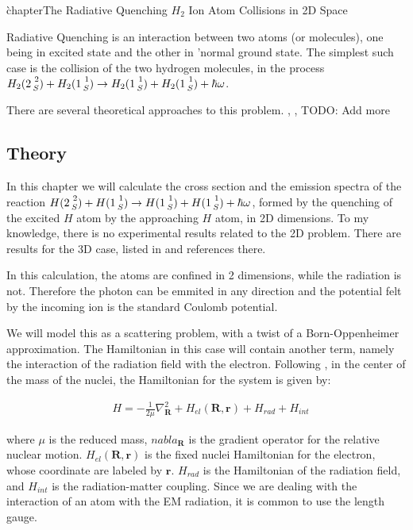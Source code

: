 \`chapter{The Radiative Quenching $ H_2 $  Ion Atom Collisions in 2D Space} 

Radiative Quenching is an interaction between two atoms (or molecules), one being in excited state and the other in 'normal ground state. The simplest such case is the collision of the two hydrogen molecules, in the process $ H_2(2\prescript{2}{S}) + H_2(1\prescript{1}{S}) \rightarrow H_2(1\prescript{1}S) + H_2(1\prescript{1}S) + \hbar\omega $.

There are several theoretical approaches to this problem. \cite{RadQuench1}, \cite{RadQuench2}, \cite{Zygelman88}
TODO: Add more

\subsection{Theory} 

In this chapter we will calculate the cross section and the emission spectra of the reaction $ H(2\prescript{2}{S}) + H(1\prescript{1}{S})\rightarrow H(1\prescript{1}S) + H(1\prescript{1}S) + \hbar\omega $, formed by the quenching of the excited $ H $ atom by the approaching $ H $ atom, in 2D dimensions. To my knowledge, there is no experimental results related to the 2D problem. There are results for the 3D case, listed in \cite{Zygelman88} and references there.

In this calculation, the atoms are confined in 2 dimensions, while the radiation is not. Therefore the photon can be emmited in any direction and the potential felt by the incoming ion is the standard Coulomb potential.

We will model this as a scattering problem, with a twist of a Born-Oppenheimer approximation. The Hamiltonian in this case will contain another term, namely the interaction of the radiation field with the electron.  Following \cite{Zygelman88},  in the center of the mass of the nuclei, the Hamiltonian for the system is given by: 

\begin{equation}\label{eqH} 
\begin{split} 
& H = -\frac{1}{2\mu}\nabla^2_{\mathbf{R}} + H_{el}(\mathbf{R},\mathbf{r}) + H_{rad} + H_{int} 
\end{split} 
\end{equation} 

where $ \mu $ is the reduced mass, $ nabla_{\mathbf{R}} $ is the gradient operator for the relative nuclear motion. $ H_{el}(\mathbf{R},\mathbf{r}) $ is the fixed nuclei Hamiltonian for the electron, whose coordinate are labeled by $ \mathbf{r} $. $ H_{rad} $ is the Hamiltonian of the radiation field, and $ H_{int} $ is the radiation-matter coupling. Since we are dealing with the interaction of an atom with the EM radiation, it is common to use the length gauge.  

